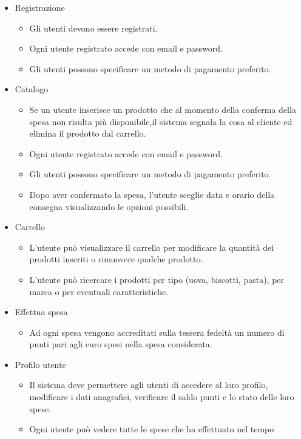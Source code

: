 \documentclass[12pt, a4paper]{report}
\begin{document}
\begin{itemize}
  \item Registrazione
    \begin{itemize}
      \item Gli utenti devono essere registrati.
      \item Ogni utente registrato accede con email e password.
      \item Gli utenti possono specificare un metodo di pagamento preferito.
    \end{itemize}
  \item Catalogo
    \begin{itemize}
      \item Se un utente inserisce un prodotto che al momento della conferma
        della spesa non risulta più disponibile,il sistema segnala la cosa al
        cliente ed elimina il prodotto dal carrello.
      \item Ogni utente registrato accede con email e password.
      \item Gli utenti possono specificare un metodo di pagamento preferito.
      \item Dopo aver confermato la spesa, l’utente sceglie data e orario della
        consegna visualizzando le opzioni possibili.
    \end{itemize}
  \item Carrello
    \begin{itemize}
      \item L’utente può visualizzare il carrello per modificare la quantità
        dei prodotti inseriti o rimuovere qualche prodotto.
      \item L’utente può ricercare i prodotti per tipo (uova, biscotti, pasta),
        per marca o per eventuali caratteristiche.
    \end{itemize}
  \item Effettua spesa
    \begin{itemize}
      \item Ad ogni spesa vengono accreditati sulla tessera fedeltà un numero
        di punti pari agli euro spesi nella spesa considerata.
    \end{itemize}
  \item Profilo utente
    \begin{itemize}
      \item Il sistema deve permettere agli utenti di accedere al loro profilo,
        modificare i dati anagrafici, verificare il saldo punti e lo stato
        delle loro spese.
      \item Ogni utente può vedere tutte le spese che ha effettuato nel tempo

\end{itemize}
\end{itemize}
\end{document}
